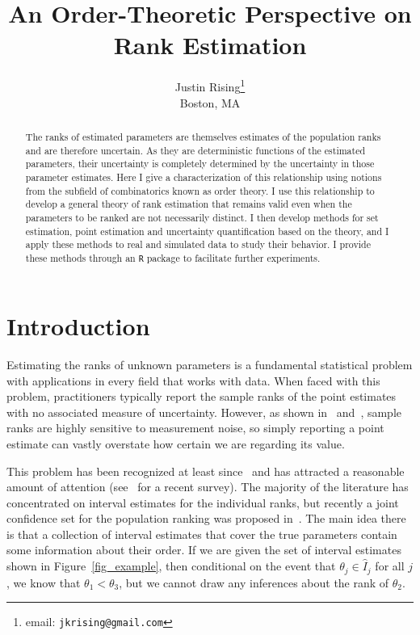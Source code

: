 \documentclass[12pt]{article}
\numberwithin{theorem}{section}
\begin{document}
\title{An Order-Theoretic Perspective on Rank Estimation}
\author{Justin Rising\thanks{email: \texttt{jkrising@gmail.com}}\\Boston, MA}
\maketitle

\begin{abstract}
The ranks of estimated parameters are themselves estimates of the population ranks and are therefore uncertain.  As they are deterministic functions of the estimated parameters, their uncertainty is completely determined by the uncertainty in those parameter estimates.  Here I give a characterization of this relationship using notions from the subfield of combinatorics known as order theory.  I use this relationship to develop a general theory of rank estimation that remains valid even when the parameters to be ranked are not necessarily distinct.  I then develop methods for set estimation, point estimation and uncertainty quantification based on the theory, and I apply these methods to real and simulated data to study their behavior.  I provide these methods through an \texttt{R} package to facilitate further experiments.
\end{abstract}

\section{Introduction}
\label{sec_intro}

Estimating the ranks of unknown parameters is a fundamental statistical problem with applications in every field that works with data.  When faced with this problem, practitioners typically report the sample ranks of the point estimates with no associated measure of uncertainty.  However, as shown in~\cite{hall2010variability} and~\cite{zuk2007uncertainty}, sample ranks are highly sensitive to measurement noise, so simply reporting a point estimate can vastly overstate how certain we are regarding its value.

This problem has been recognized at least since~\cite{goldstein1996tables} and has attracted a reasonable amount of attention (see~\cite{almohamad2022rankCIs} for a recent survey).  The majority of the literature has concentrated on interval estimates for the individual ranks, but recently a joint confidence set for the population ranking was proposed in~\cite{klein2020jointCR}.  The main idea there is that a collection of interval estimates that cover the true parameters contain some information about their order.  If we are given the set of interval estimates shown in Figure~\ref{fig_example}, then conditional on the event that $\theta_j \in \hat{I}_j$ for all $j$, we know that $\theta_1 < \theta_3$, but we cannot draw any inferences about the rank of $\theta_2$.
\end{document}
